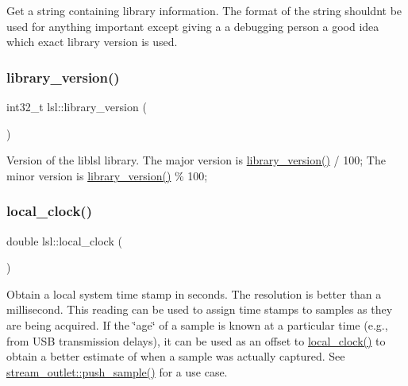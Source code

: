 Get a string containing library information. The format of the string shouldn\textquotesingle{}t be used for anything important except giving a a debugging person a good idea which exact library version is used. \mbox{\label{namespacelsl_a25fc4deea3c2fb0df0744e3a24c56844}} 
\subsubsection{\texorpdfstring{library\+\_\+version()}{library\_version()}}
{\footnotesize\ttfamily int32\+\_\+t lsl\+::library\+\_\+version (\begin{DoxyParamCaption}{ }\end{DoxyParamCaption})\hspace{0.3cm}{\ttfamily [inline]}}

Version of the liblsl library. The major version is \hyperlink{namespacelsl_a25fc4deea3c2fb0df0744e3a24c56844}{library\+\_\+version()} / 100; The minor version is \hyperlink{namespacelsl_a25fc4deea3c2fb0df0744e3a24c56844}{library\+\_\+version()} \% 100; \mbox{\label{namespacelsl_ae1766ae2ab66141cb927612e57a0c8c6}} 
\subsubsection{\texorpdfstring{local\+\_\+clock()}{local\_clock()}}
{\footnotesize\ttfamily double lsl\+::local\+\_\+clock (\begin{DoxyParamCaption}{ }\end{DoxyParamCaption})\hspace{0.3cm}{\ttfamily [inline]}}

Obtain a local system time stamp in seconds. The resolution is better than a millisecond. This reading can be used to assign time stamps to samples as they are being acquired. If the \char`\"{}age\char`\"{} of a sample is known at a particular time (e.\+g., from U\+SB transmission delays), it can be used as an offset to \hyperlink{namespacelsl_ae1766ae2ab66141cb927612e57a0c8c6}{local\+\_\+clock()} to obtain a better estimate of when a sample was actually captured. See \hyperlink{classlsl_1_1stream__outlet_a675bbe044a5053087e05e0267fe6722a}{stream\+\_\+outlet\+::push\+\_\+sample()} for a use case. \mbox{\label{namespacelsl_a4e7b789b1a631d207683ba6fd821571f}} 
